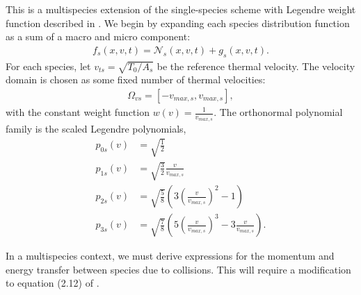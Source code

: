 \documentclass{article}
\begin{document}
This is a multispecies extension of the single-species scheme with Legendre weight function 
described in \cite{coughlinRobustConservativeDynamical2024}.
We begin by expanding each species distribution function as a sum of a macro and micro component:
\begin{align*}
f_s(x, v, t) = \mathcal{N}_s(x, v, t) + g_s(x, v, t).
\end{align*}
For each species, let $v_{ts} = \sqrt{T_0 / A_s}$ be the reference thermal velocity.
The velocity domain is chosen as some fixed number of thermal velocities:
\begin{align*}
    \Omega_{vs} = [-v_{max,s}, v_{max,s}],
\end{align*}
with the constant weight function $w(v) = \frac{1}{v_{max,s}}$.
The orthonormal polynomial family is the scaled Legendre polynomials,
\begin{align*}
    p_{0s}(v) &= \sqrt{\frac{1}{2}} \\
    p_{1s}(v) &= \sqrt{\frac{3}{2}} \frac{v}{v_{max,s}} \\
    p_{2s}(v) &= \sqrt{\frac{5}{8}} \left( 3 \left( \frac{v}{v_{max,s}} \right)^2 - 1 \right)  \\
    p_{3s}(v) &= \sqrt{\frac{7}{8}} \left( 5 \left( \frac{v}{v_{max,s}} \right)^3 - 3 \frac{v}{v_{max,s}} \right). 
\end{align*}

In a multispecies context, we must derive expressions for the momentum and energy transfer between
species due to collisions.
This will require a modification to equation (2.12) of \cite{coughlinRobustConservativeDynamical2024}.
\end{document}
